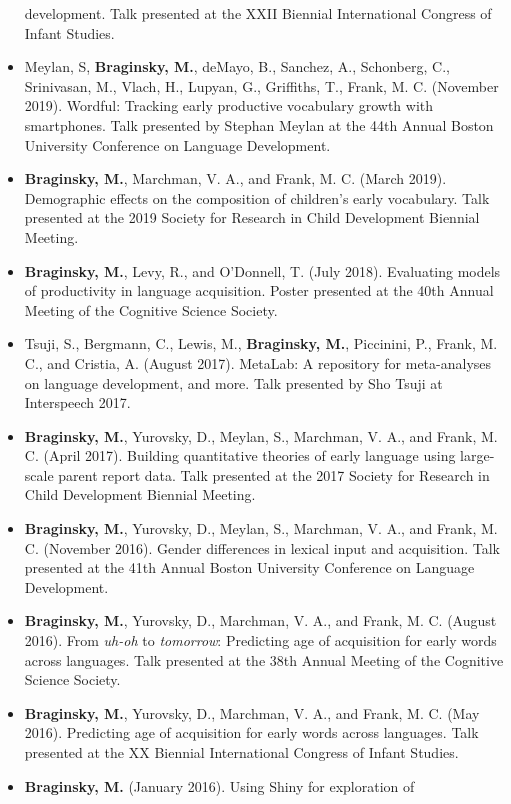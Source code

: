 \documentclass[11pt,]{article}
\begin{document}
\begin{itemize}
  development. Talk presented at the XXII Biennial International
  Congress of Infant Studies.
\item
  Meylan, S, \textbf{Braginsky, M.}, deMayo, B., Sanchez, A., Schonberg,
  C., Srinivasan, M., Vlach, H., Lupyan, G., Griffiths, T., Frank, M. C.
  (November 2019). Wordful: Tracking early productive vocabulary growth
  with smartphones. Talk presented by Stephan Meylan at the 44th Annual
  Boston University Conference on Language Development.
\item
  \textbf{Braginsky, M.}, Marchman, V. A., and Frank, M. C. (March
  2019). Demographic effects on the composition of children's early
  vocabulary. Talk presented at the 2019 Society for Research in Child
  Development Biennial Meeting.
\item
  \textbf{Braginsky, M.}, Levy, R., and O'Donnell, T. (July 2018).
  Evaluating models of productivity in language acquisition. Poster
  presented at the 40th Annual Meeting of the Cognitive Science Society.
\item
  Tsuji, S., Bergmann, C., Lewis, M., \textbf{Braginsky, M.}, Piccinini,
  P., Frank, M. C., and Cristia, A. (August 2017). MetaLab: A repository
  for meta-analyses on language development, and more. Talk presented by
  Sho Tsuji at Interspeech 2017.
\item
  \textbf{Braginsky, M.}, Yurovsky, D., Meylan, S., Marchman, V. A., and
  Frank, M. C. (April 2017). Building quantitative theories of early
  language using large-scale parent report data. Talk presented at the
  2017 Society for Research in Child Development Biennial Meeting.
\item
  \textbf{Braginsky, M.}, Yurovsky, D., Meylan, S., Marchman, V. A., and
  Frank, M. C. (November 2016). Gender differences in lexical input and
  acquisition. Talk presented at the 41th Annual Boston University
  Conference on Language Development.
\item
  \textbf{Braginsky, M.}, Yurovsky, D., Marchman, V. A., and Frank, M.
  C. (August 2016). From \emph{uh-oh} to \emph{tomorrow}: Predicting age
  of acquisition for early words across languages. Talk presented at the
  38th Annual Meeting of the Cognitive Science Society.
\item
  \textbf{Braginsky, M.}, Yurovsky, D., Marchman, V. A., and Frank, M.
  C. (May 2016). Predicting age of acquisition for early words across
  languages. Talk presented at the XX Biennial International Congress of
  Infant Studies.
\item
  \textbf{Braginsky, M.} (January 2016). Using Shiny for exploration of

\end{itemize}
\end{document}
